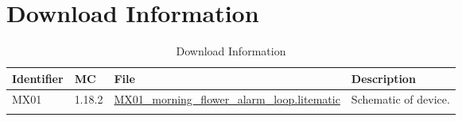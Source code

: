\documentclass[10pt]{datasheet}
\begin{document}
\section{Download Information}
\begin{table}[h]
    \caption{Download Information}
    \begin{tabularx}{\textwidth}{l | l | l | X}
        \thickhline
        \textbf{Identifier} & \textbf{MC} & \textbf{File} & \textbf{Description} \\
        \hline
        MX01 & 1.18.2 & \href{https://github.com/Soontech-Annals/Archive/blob/8413f90a054b6c415703bae02badeba7541344f6/Archive/everything-bagel/MX01\%20Morning\%20Flower\%20Alarm\%20Loop/MX01\_morning\_flower\_alarm\_loop.litematic?raw=1}{MX01\_morning\_flower\_alarm\_loop.litematic} & Schematic of device. \\
        \hline
        \thickhline
    \end{tabularx}
\end{table}
\end{document}
